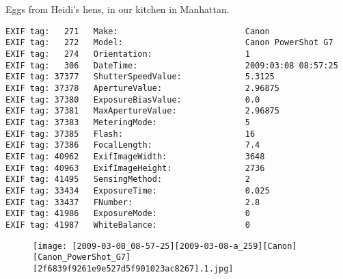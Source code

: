 \section{\protect{}}
\noindent Eggs from Heidi's hens, in our kitchen in Manhattan.
\noindent
\begin{lstlisting}
EXIF tag:   271   Make:                          Canon
EXIF tag:   272   Model:                         Canon PowerShot G7
EXIF tag:   274   Orientation:                   1
EXIF tag:   306   DateTime:                      2009:03:08 08:57:25
EXIF tag: 37377   ShutterSpeedValue:             5.3125
EXIF tag: 37378   ApertureValue:                 2.96875
EXIF tag: 37380   ExposureBiasValue:             0.0
EXIF tag: 37381   MaxApertureValue:              2.96875
EXIF tag: 37383   MeteringMode:                  5
EXIF tag: 37385   Flash:                         16
EXIF tag: 37386   FocalLength:                   7.4
EXIF tag: 40962   ExifImageWidth:                3648
EXIF tag: 40963   ExifImageHeight:               2736
EXIF tag: 41495   SensingMethod:                 2
EXIF tag: 33434   ExposureTime:                  0.025
EXIF tag: 33437   FNumber:                       2.8
EXIF tag: 41986   ExposureMode:                  0
EXIF tag: 41987   WhiteBalance:                  0

\end{lstlisting}
\clearpage
\begin{figure}
\raggedleft
\texttt{[image: [2009-03-08\_08-57-25][2009-03-08-a\_259][Canon][Canon\_PowerShot\_G7][2f6839f9261e9e527d5f901023ac8267].1.jpg]}
\end{figure}


\clearpage
